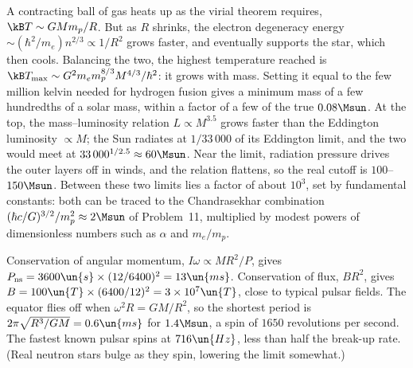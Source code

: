  A contracting ball of gas heats up as the virial theorem requires, $\kB T\sim GMm_p/R$. But as $R$ shrinks, the electron degeneracy energy $\sim(\hbar^2/m_e)n^{2/3}\propto1/R^2$ grows faster, and eventually supports the star, which then cools. Balancing the two, the highest temperature reached is $\kB T_{\max}\sim G^2m_em_p^{8/3}M^{4/3}/\hbar^2$: it grows with mass. Setting it equal to the few million kelvin needed for hydrogen fusion gives a minimum mass of a few hundredths of a solar mass, within a factor of a few of the true $0.08\Msun$. At the top, the mass--luminosity relation $L\propto M^{3.5}$ grows faster than the Eddington luminosity $\propto M$; the Sun radiates at $1/33\,000$ of its Eddington limit, and the two would meet at $33\,000^{1/2.5}\approx60\Msun$. Near the limit, radiation pressure drives the outer layers off in winds, and the relation flattens, so the real cutoff is $100$--$150\Msun$. Between these two limits lies a factor of about $10^3$, set by fundamental constants: both can be traced to the Chandrasekhar combination $(\hbar c/G)^{3/2}/m_p^2\approx2\Msun$ of Problem~11, multiplied by modest powers of dimensionless numbers such as $\alpha$ and $m_e/m_p$.

 Conservation of angular momentum, $I\omega\propto MR^2/P$, gives $P_{\text{ns}} = 3600\un{s}\times(12/6400)^2 = 13\un{ms}$. Conservation of flux, $BR^2$, gives $B = 100\un{T}\times(6400/12)^2 = 3\times10^{7}\un{T}$, close to typical pulsar fields. The equator flies off when $\omega^2R = GM/R^2$, so the shortest period is $2\pi\sqrt{R^3/GM} = 0.6\un{ms}$ for $1.4\Msun$, a spin of $1650$ revolutions per second. The fastest known pulsar spins at $716\un{Hz}$, less than half the break-up rate. (Real neutron stars bulge as they spin, lowering the limit somewhat.)
